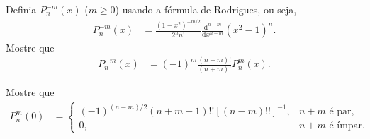 \documentclass[a4paper,12pt, leqno, answers]{exam}
\begin{document}
\begin{questions}

    \question Definia $P_n^{-m}(x)$ ($m \geq 0$) usando a f\'{o}rmula de Rodrigues, ou seja,
    \begin{align*}
        P_n^{-m}(x) &= \frac{(1 - x^2)^{-m/2}}{2^n n!} \frac{\mathrm{d}^{n - m}}{\mathrm{d}x^{n - m}}\left( x^2 - 1 \right)^n.
    \end{align*}
    Mostre que
    \begin{align*}
        P_n^{-m}(x) &= (-1)^m \frac{(n - m)!}{(n + m)!} P_n^m(x).
    \end{align*}
    \begin{solution}
        
    \end{solution}

    \question Mostre que
    \begin{align*}
        P_n^m(0) &= \begin{cases}
            (-1)^{(n - m)/2} (n + m - 1)!! \left[ (n - m)!! \right]^{-1}, & \text{$n + m$ \'{e} par,} \\
            0, & \text{$n + m$ \'{e} \'{i}mpar.}
        \end{cases}
    \end{align*}
    \begin{solution}
        
    \end{solution}
\end{questions}
\end{document}
